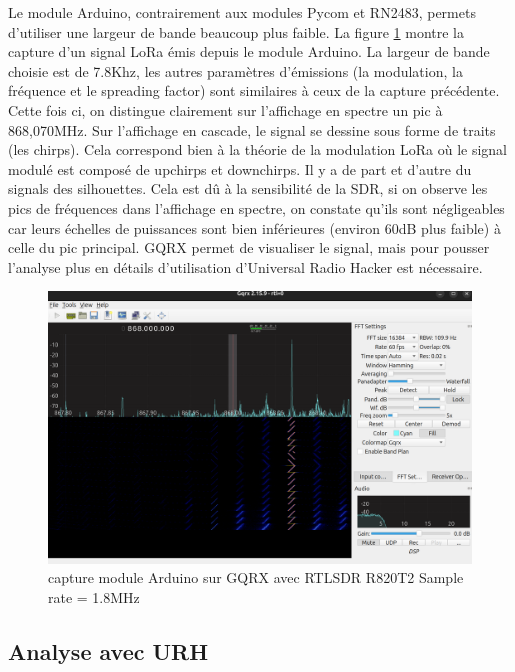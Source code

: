 Le module Arduino, contrairement aux modules Pycom et RN2483, permets d'utiliser une largeur de bande beaucoup plus faible. La figure \ref{term302} montre la capture d'un signal LoRa émis depuis le module Arduino. La largeur de bande choisie est de 7.8Khz, les autres paramètres d'émissions (la modulation, la fréquence et le spreading factor) sont similaires à ceux de la capture précédente. Cette fois ci, on distingue clairement sur l'affichage en spectre un pic à 868,070MHz. Sur l'affichage en cascade, le signal se dessine sous forme de traits (les chirps). Cela correspond bien à la théorie de la modulation LoRa où le signal modulé est composé de upchirps et downchirps. Il y a de part et d'autre du signals des silhouettes. Cela est dû à la sensibilité de la SDR, si on observe les pics de fréquences dans l'affichage en spectre, on constate qu'ils sont négligeables car leurs échelles de puissances sont bien inférieures (environ 60dB plus faible) à celle du pic principal. GQRX permet de visualiser le signal, mais pour pousser l'analyse plus en détails d'utilisation d'Universal Radio Hacker est nécessaire.

\begin{figure}[h]
\centering

\includegraphics[scale=0.17]{images/gqrx5.png}
\caption{capture module Arduino sur GQRX avec RTLSDR R820T2 Sample rate = 1.8MHz}\label{term302}
\end{figure}


\subsection{Analyse avec URH}\label{urh}

